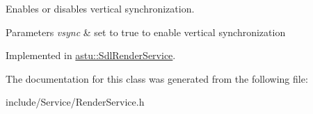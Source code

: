 Enables or disables vertical synchronization.


\begin{DoxyParams}{Parameters}
{\em vsync} & set to {\ttfamily true} to enable vertical synchronization \\
\hline
\end{DoxyParams}


Implemented in \hyperlink{classastu_1_1SdlRenderService_a4887120e1595f4b257e4813e09121e89}{astu\+::\+Sdl\+Render\+Service}.



The documentation for this class was generated from the following file\+:\begin{DoxyCompactItemize}
\item 
include/\+Service/Render\+Service.\+h\end{DoxyCompactItemize}
